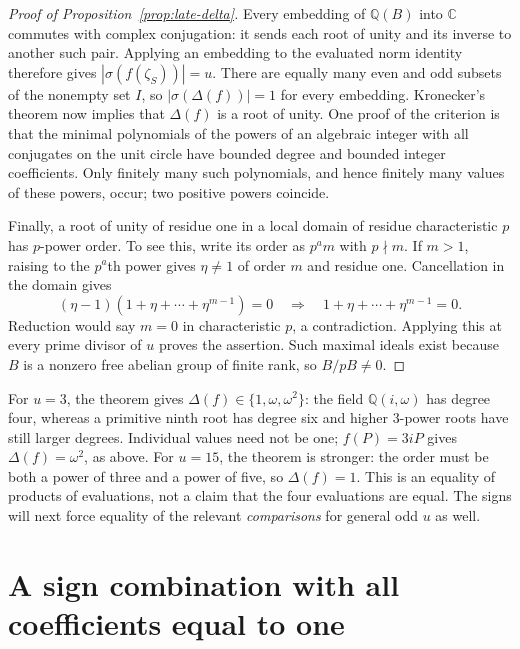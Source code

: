 \documentclass[11pt]{article}
\begin{document}
\begin{proof}[Proof of Proposition~\ref{prop:late-delta}]
Every embedding of $\mathbb Q(B)$ into $\mathbb C$ commutes with
complex conjugation: it sends each root of unity and its inverse to
another such pair. Applying an embedding to the evaluated norm identity
therefore gives $|\sigma(f(\zeta_{S}))|=u$. There are equally many even
and odd subsets of the nonempty set $I$, so
$|\sigma(\Delta(f))|=1$ for every embedding. Kronecker's theorem now
implies that $\Delta(f)$ is a root of unity. One proof of the criterion
is that the minimal polynomials of the powers of an algebraic integer
with all conjugates on the unit circle have bounded degree and bounded
integer coefficients. Only finitely many such polynomials, and hence
finitely many values of these powers, occur; two positive powers coincide.

Finally, a root of unity of residue one in a local domain of residue
characteristic $p$ has $p$-power order. To see this, write its order as
$p^{a} m$ with $p\nmid m$. If $m>1$, raising to the $p^{a}$th power gives
$\eta\ne1$ of order $m$ and residue one. Cancellation in the domain gives
\[
 (\eta-1)(1+\eta+\cdots+\eta^{m-1})=0
 \quad\Longrightarrow\quad
 1+\eta+\cdots+\eta^{m-1}=0.
\]
Reduction would say $m=0$ in characteristic $p$, a contradiction.
Applying this at every prime divisor of $u$ proves the assertion.
Such maximal ideals exist because $B$ is a nonzero free abelian group
of finite rank, so $B/pB\ne0$.
\end{proof}

For $u=3$, the theorem gives
$\Delta(f)\in\{1,\omega,\omega^{2}\}$: the field
$\mathbb Q(i,\omega)$ has degree four, whereas a primitive ninth root
has degree six and higher $3$-power roots have still larger degrees.
Individual values need not be one; $f(P)=3iP$ gives
$\Delta(f)=\omega^{2}$, as above. For $u=15$, the theorem is stronger:
the order must be both a power of three and a power of five, so
$\Delta(f)=1$. This is an equality of products of evaluations, not a
claim that the four evaluations are equal. The signs will next force
equality of the relevant \emph{comparisons} for general odd $u$ as well.

\section{A sign combination with all coefficients equal to one}%
\label{sec:late-signs}
\end{document}

